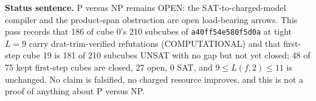 \documentclass[11pt]{article}
\begin{document}
\bigskip
\noindent\textbf{Status sentence.} P versus NP remains OPEN: the SAT-to-charged-model compiler and the product-span obstruction are open load-bearing arrows. This pass records that 186 of cube 0's 210 subcubes of \texttt{a40ff54e580f5d0a} at tight $L=9$ carry drat-trim-verified refutations (COMPUTATIONAL) and that first-step cube 19 is 181 of 210 subcubes UNSAT with no gap but not yet closed; 48 of 75 kept first-step cubes are closed, 27 open, 0 SAT, and $9\le L(f,2)\le 11$ is unchanged. No claim is falsified, no charged resource improves, and this is not a proof of anything about P versus NP.
\end{document}

